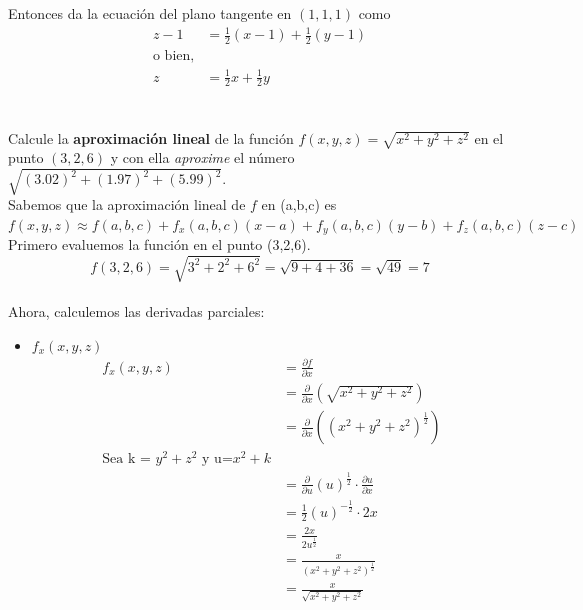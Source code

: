 \documentclass[12pt]{article}
\begin{document}
\begin{itemize}[format=\textbf]
\begin{itemize}[format=\textbf]
Entonces da la ecuación del plano tangente en $(1,1,1)$ como
\begin{align*}
z-1 &= \frac{1}{2}(x-1) + \frac{1}{2}(y-1) \\
\text{o bien,}\\
z &= \frac{1}{2}x + \frac{1}{2}y
\end{align*}
\end{itemize}


\section{}

Calcule la \textbf{aproximación lineal} de la función $f(x,y,z)=\sqrt{x^2+y^2+z^2}$ en el punto $(3,2,6)$ y con ella \textit{aproxime} el número $\sqrt{(3.02)^2+(1.97)^2+(5.99)^2}$.\\
Sabemos que la aproximación lineal de $f$ en (a,b,c) es $f(x,y,z) \approx f(a,b, c) + f_x(a,b,c)(x-a)+f_y(a,b,c)(y-b) + f_z(a,b,c)(z-c)$\\
Primero evaluemos la función en el punto (3,2,6).\\
$$f(3,2,6)=\sqrt{3^2+2^2+6^2}=\sqrt{9+4+36} =\sqrt{49} = 7$$\\
Ahora, calculemos las derivadas parciales:
\begin{itemize}
\item $f_x(x,y,z)$ \\
  \begin{align*}
    f_x(x,y,z) &= \frac{\partial f}{\partial x} \\
    &= \frac{\partial}{\partial x} \left( \sqrt{x^2+y^2+z^2} \right) \\
    &= \frac{\partial}{\partial x} \left( (x^2+y^2+z^2)^{\frac{1}{2}} \right) \\
     \text{Sea k = $y^2 + z^2$ y u=$x^2 + k$} \\
     &= \frac{\partial}{\partial u}(u)^{\frac{1}{2}} \cdot \frac{\partial u}{\partial x} \\
     &= \frac{1}{2}(u)^{-\frac{1}{2}} \cdot 2x \\
     &= \frac{2x}{2u^{\frac{1}{2}}}\\
     &= \frac{x}{(x^2 + y^2 + z^2)^{\frac{1}{2}}}\\
     &= \frac{x}{\sqrt{x^2 + y^2 + z^2}}
  \end{align*}


\end{itemize}
\end{itemize}
\end{document}
